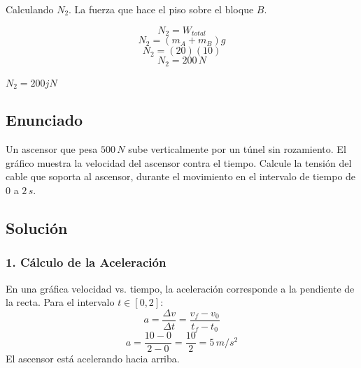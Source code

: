 \documentclass[12pt, a4paper]{article}
\begin{document}
Calculando $N_2$. La fuerza que hace el piso sobre el bloque $B$.

$$ N_2 = W_{total} $$
$$ N_2 = (m_A + m_B)g $$
$$ N_2 = (20)(10) $$
$$ N_2 = 200 \, \si{N} $$

\begin{tcolorbox}[colback=green!5!white, colframe=green!50!black, title=Respuesta Final]
\centering \Large $ N_2 = 200 jN $
\end{tcolorbox}

\newpage

\subsection*{Enunciado}
Un ascensor que pesa $500 \, \si{N}$ sube verticalmente por un túnel sin rozamiento. El gráfico muestra la velocidad del ascensor contra el tiempo. Calcule la tensión del cable que soporta al ascensor, durante el movimiento en el intervalo de tiempo de $0$ a $2 \, \si{s}$.

\begin{center}
\end{center}

\subsection*{Solución}

\subsubsection*{1. Cálculo de la Aceleración}
En una gráfica velocidad vs. tiempo, la aceleración corresponde a la pendiente de la recta.
Para el intervalo $t \in [0, 2]$:
$$ a = \frac{\Delta v}{\Delta t} = \frac{v_f - v_0}{t_f - t_0} $$
$$ a = \frac{10 - 0}{2 - 0} = \frac{10}{2} = 5 \, \si{m/s^2} $$
El ascensor está acelerando hacia arriba.
\end{document}
